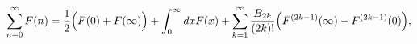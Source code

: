 \begin{equation}
\sum_{n = 0}^{\infty} F(n) = \frac{1}{2} \Bigl(F(0) + F(\infty) \Bigr)
+ \int_{0}^{\infty} dx F(x) + \sum_{k = 1}^{\infty} 
\frac{B_{2k}}{(2k)!} \Bigl(F^{(2k-1)} (\infty) - F^{(2k - 1)} (0) \Bigr),
\end{equation}

